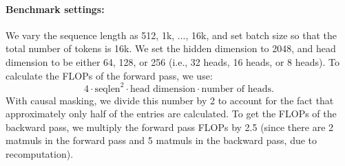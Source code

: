 \paragraph{Benchmark settings:} We vary the sequence length as 512, 1k, ..., 16k, and set
batch size so that the total number of tokens is 16k.
We set the hidden dimension to 2048, and head dimension to be either 64, 128, or 256
(i.e., 32 heads, 16 heads, or 8 heads).
To calculate the FLOPs of the forward pass, we use:
\begin{equation*}
  4 \cdot \text{seqlen}^2 \cdot \text{head dimension} \cdot \text{number of heads}.
\end{equation*}
With causal masking, we divide this number by 2 to account for the fact that
approximately only half of the entries are calculated.
To get the FLOPs of the backward pass, we multiply the forward pass FLOPs by 2.5
(since there are 2 matmuls in the forward pass and 5 matmuls in the backward
pass, due to recomputation).

